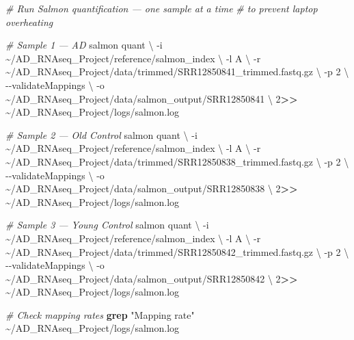 \documentclass[
]{article}
\newenvironment{Shaded}{\begin{snugshade}}{\end{snugshade}}
\newcommand{\AttributeTok}[1]{\textcolor[rgb]{0.13,0.29,0.53}{#1}}
\newcommand{\CommentTok}[1]{\textcolor[rgb]{0.56,0.35,0.01}{\textit{#1}}}
\newcommand{\DataTypeTok}[1]{\textcolor[rgb]{0.13,0.29,0.53}{#1}}
\newcommand{\DecValTok}[1]{\textcolor[rgb]{0.00,0.00,0.81}{#1}}
\newcommand{\ExtensionTok}[1]{#1}
\newcommand{\FunctionTok}[1]{\textcolor[rgb]{0.13,0.29,0.53}{\textbf{#1}}}
\newcommand{\NormalTok}[1]{#1}
\newcommand{\OperatorTok}[1]{\textcolor[rgb]{0.81,0.36,0.00}{\textbf{#1}}}
\newcommand{\StringTok}[1]{\textcolor[rgb]{0.31,0.60,0.02}{#1}}
\begin{document}
\begin{Shaded}
\begin{Highlighting}[]
\CommentTok{\# Run Salmon quantification — one sample at a time}
\CommentTok{\# to prevent laptop overheating}

\CommentTok{\# Sample 1 — AD}
\ExtensionTok{salmon}\NormalTok{ quant }\DataTypeTok{\textbackslash{}}
    \AttributeTok{{-}i}\NormalTok{ \textasciitilde{}/AD\_RNAseq\_Project/reference/salmon\_index }\DataTypeTok{\textbackslash{}}
    \AttributeTok{{-}l}\NormalTok{ A }\DataTypeTok{\textbackslash{}}
    \AttributeTok{{-}r}\NormalTok{ \textasciitilde{}/AD\_RNAseq\_Project/data/trimmed/SRR12850841\_trimmed.fastq.gz }\DataTypeTok{\textbackslash{}}
    \AttributeTok{{-}p}\NormalTok{ 2 }\DataTypeTok{\textbackslash{}}
    \AttributeTok{{-}{-}validateMappings} \DataTypeTok{\textbackslash{}}
    \AttributeTok{{-}o}\NormalTok{ \textasciitilde{}/AD\_RNAseq\_Project/data/salmon\_output/SRR12850841 }\DataTypeTok{\textbackslash{}}
    \DecValTok{2}\OperatorTok{\textgreater{}\textgreater{}}\NormalTok{ \textasciitilde{}/AD\_RNAseq\_Project/logs/salmon.log}

\CommentTok{\# Sample 2 — Old Control}
\ExtensionTok{salmon}\NormalTok{ quant }\DataTypeTok{\textbackslash{}}
    \AttributeTok{{-}i}\NormalTok{ \textasciitilde{}/AD\_RNAseq\_Project/reference/salmon\_index }\DataTypeTok{\textbackslash{}}
    \AttributeTok{{-}l}\NormalTok{ A }\DataTypeTok{\textbackslash{}}
    \AttributeTok{{-}r}\NormalTok{ \textasciitilde{}/AD\_RNAseq\_Project/data/trimmed/SRR12850838\_trimmed.fastq.gz }\DataTypeTok{\textbackslash{}}
    \AttributeTok{{-}p}\NormalTok{ 2 }\DataTypeTok{\textbackslash{}}
    \AttributeTok{{-}{-}validateMappings} \DataTypeTok{\textbackslash{}}
    \AttributeTok{{-}o}\NormalTok{ \textasciitilde{}/AD\_RNAseq\_Project/data/salmon\_output/SRR12850838 }\DataTypeTok{\textbackslash{}}
    \DecValTok{2}\OperatorTok{\textgreater{}\textgreater{}}\NormalTok{ \textasciitilde{}/AD\_RNAseq\_Project/logs/salmon.log}

\CommentTok{\# Sample 3 — Young Control}
\ExtensionTok{salmon}\NormalTok{ quant }\DataTypeTok{\textbackslash{}}
    \AttributeTok{{-}i}\NormalTok{ \textasciitilde{}/AD\_RNAseq\_Project/reference/salmon\_index }\DataTypeTok{\textbackslash{}}
    \AttributeTok{{-}l}\NormalTok{ A }\DataTypeTok{\textbackslash{}}
    \AttributeTok{{-}r}\NormalTok{ \textasciitilde{}/AD\_RNAseq\_Project/data/trimmed/SRR12850842\_trimmed.fastq.gz }\DataTypeTok{\textbackslash{}}
    \AttributeTok{{-}p}\NormalTok{ 2 }\DataTypeTok{\textbackslash{}}
    \AttributeTok{{-}{-}validateMappings} \DataTypeTok{\textbackslash{}}
    \AttributeTok{{-}o}\NormalTok{ \textasciitilde{}/AD\_RNAseq\_Project/data/salmon\_output/SRR12850842 }\DataTypeTok{\textbackslash{}}
    \DecValTok{2}\OperatorTok{\textgreater{}\textgreater{}}\NormalTok{ \textasciitilde{}/AD\_RNAseq\_Project/logs/salmon.log}

\CommentTok{\# Check mapping rates}
\FunctionTok{grep} \StringTok{"Mapping rate"}\NormalTok{ \textasciitilde{}/AD\_RNAseq\_Project/logs/salmon.log}
\end{Highlighting}
\end{Shaded}
\end{document}
